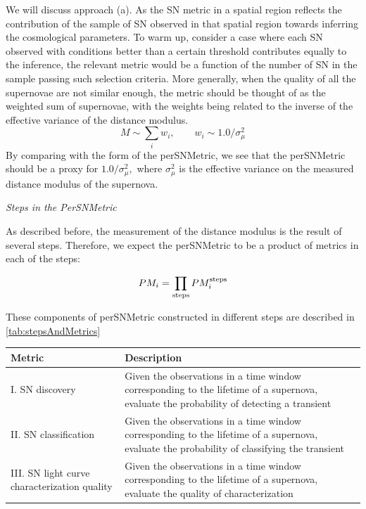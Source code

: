 We will discuss approach (a). As the SN metric in a spatial region
reflects the contribution of the sample of SN observed in that spatial
region towards inferring the cosmological parameters. To warm up,
consider a case where each SN observed with conditions better than a
certain threshold contributes equally to the inference, the relevant
metric would be a function of the number of SN in the sample passing
such selection criteria. More generally, when the quality of all the
supernovae are not similar enough, the metric should be thought of as
the weighted sum of supernovae, with the weights being related to the
inverse of the effective variance of the distance modulus.
\begin{equation}
M\sim \sum_i w_i , \qquad  w_i \sim 1.0 /\sigma^2_\mu
\end{equation}
By comparing with the form of the perSNMetric, we see that the
perSNMetric should be a proxy for $1.0/\sigma^2_\mu,$ where
$\sigma^2_\mu$ is the effective variance on the measured distance
modulus of the supernova.

{\it  Steps in the PerSNMetric}

As described before, the measurement of the distance modulus is the
result of several steps. Therefore, we expect the perSNMetric to be a
product of metrics in each of the steps:

\begin{equation}
PM_i = \prod_{\rm{steps}} PM_i^{\rm{steps}}
\end{equation}

These components of perSNMetric constructed in different steps are
described in \autoref{tab:stepsAndMetrics}
\begin{center}
 \begin{table}
\begin{tabular}{| p{5cm} |p{10cm}| }
\hline Metric & Description \\
\hline
I. SN discovery  &  Given the observations in a time window corresponding to the lifetime of a supernova, evaluate the  probability of detecting a
transient \\
II. SN classification & Given the observations in a time window corresponding to the lifetime of a supernova, evaluate the probability of classifying the transient\\
III. SN light curve characterization quality & Given the observations in a time window corresponding to the lifetime of a supernova, evaluate the quality of characterization\\
\hline \end{tabular}
\label{tab:stepsAndMetrics}
\end{table}
\end{center}



